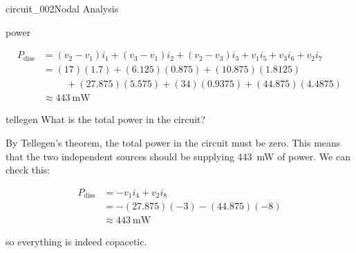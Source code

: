 \begin{mainquestion}{circuit_002}{Nodal Analysis}
\begin{partquestion}{power}
\begin{answer}
\begin{align*}
P_{\text{diss}} &= (v_2 - v_1)i_1 + (v_3 - v_1)i_2 + (v_2 - v_3)i_3 + v_1i_5 + v_3i_6 + v_2i_7 \\
&= (17)(1.7) + (6.125)(0.875) + (10.875)(1.8125) \\
&\hspace{1cm} + (27.875)(5.575) + (34)(0.9375) + (44.875)(4.4875) \\
&\approx \qty{443}{\milli\watt}
\end{align*}

\end{answer}
\end{partquestion}

\begin{partquestion}{tellegen}
{What is the total power in the circuit?}

\begin{answer}
By Tellegen’s theorem, the total power in the circuit must be zero. This means that the two independent sources should be supplying \qty{443}{\milli\watt} of power. We can check this:

\begin{align*}
P_{\text{diss}} &= -v_1i_4 + v_2i_8\\
&= -(27.875)(-3) - (44.875)(-8) \\
&\approx \qty{443}{\milli\watt}
\end{align*}

so everything is indeed copacetic.
\end{answer}
\end{partquestion}

\end{mainquestion}